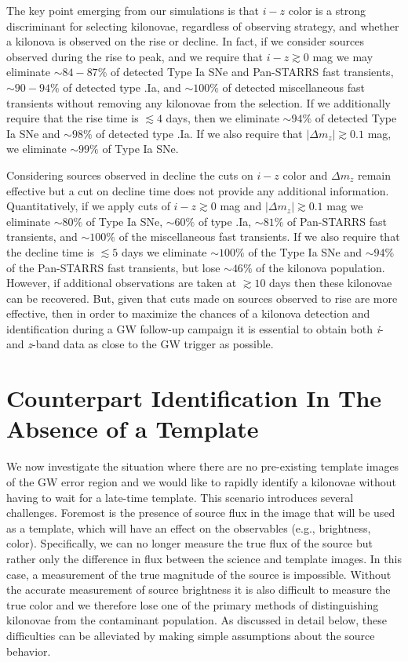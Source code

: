 \clearpage
The key point emerging from our simulations is that $i-z$ color is a strong discriminant for selecting kilonovae, regardless of observing strategy, and whether a kilonova is observed on the rise or decline. In fact, if we consider sources observed during the rise to peak, and we require that $i-z\gtrsim0$ mag we may eliminate $\sim84-87\%$ of detected Type Ia SNe and Pan-STARRS fast transients, $\sim90-94\%$ of detected type .Ia, and $\sim100\%$ of detected miscellaneous fast transients without removing any kilonovae from the selection. If we additionally require that the rise time is $\lesssim4$ days, then we eliminate $\sim94\%$ of detected Type Ia SNe and $\sim98\%$ of detected type .Ia. If we also require that $|\Delta m_z| \gtrsim 0.1$ mag, we eliminate $\sim99\%$ of Type Ia SNe.

Considering sources observed in decline the cuts on $i-z$ color and $\Delta m_z$ remain effective but a cut on decline time does not provide any additional information. Quantitatively, if we apply cuts of $i-z \gtrsim 0$ mag and $|\Delta m_z| \gtrsim 0.1$ mag we eliminate $\sim80\%$ of Type Ia SNe, $\sim60\%$ of type .Ia, $\sim81\%$ of Pan-STARRS fast transients, and $\sim 100\%$ of the miscellaneous fast transients. If we also require that the decline time is $\lesssim 5$ days we eliminate $\sim 100\%$ of the Type Ia SNe and $\sim94\%$ of the Pan-STARRS fast transients, but lose $\sim46\%$ of the kilonova population. However, if additional observations are taken at $\gtrsim10$ days then these kilonovae can be recovered. But, given that cuts made on sources observed to rise are more effective, then in order to maximize the chances of a kilonova detection and identification during a GW follow-up campaign it is essential to obtain both {\em i}- and {\em z}-band data as close to the GW trigger as possible.

\section{Counterpart Identification In The Absence of a Template}
\label{sec:ch2_diff}
We now investigate the situation where there are no pre-existing template images of the GW error region and we would like to rapidly identify a kilonovae without having to wait for a late-time template. This scenario introduces several challenges. Foremost is the presence of source flux in the image that will be used as a template, which will have an effect on the observables (e.g., brightness, color). Specifically, we can no longer measure the true flux of the source but rather only the difference in flux between the science and template images. In this case, a measurement of the true magnitude of the source is impossible. Without the accurate measurement of source brightness it is also difficult to measure the true color and we therefore lose one of the primary methods of distinguishing kilonovae from the contaminant population. As discussed in detail below, these difficulties can be alleviated by making simple assumptions about the source behavior.

